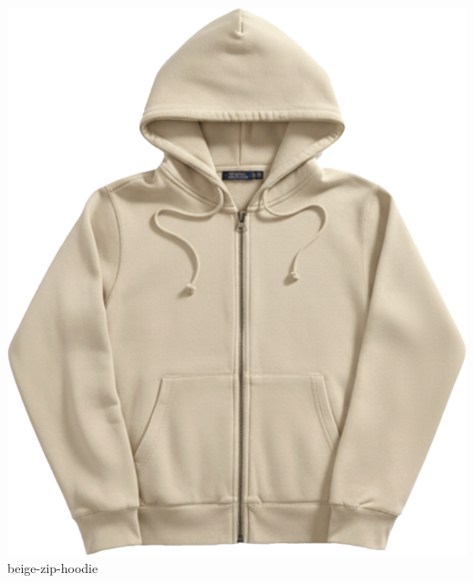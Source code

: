 \documentclass[10pt]{article}
\begin{document}
\begin{minipage}[t]{0.22\textwidth}\centering\vspace{0mm}
\includegraphics[width=\linewidth,keepaspectratio]{assets/midlayer/beige-zip-hoodie.png}\\
\vspace{0.5mm}\tiny beige-zip-hoodie\end{minipage}
\end{document}
